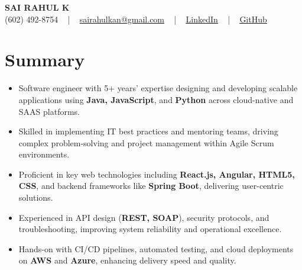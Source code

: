\documentclass[letterpaper,11pt]{article}
\newcommand{\resumeItem}[1]{
  \item\footnotesize{
    {#1 \vspace{-2pt}}
  }
}
\newcommand{\resumeItemListStart}{\begin{itemize}[leftmargin=*]}
\newcommand{\resumeItemListEnd}{\end{itemize}\vspace{-5pt}}
\begin{document}
\begin{center}
    {\fontsize{14pt}{12pt}\selectfont \textbf{\MakeUppercase{Sai Rahul K}}}\\ \vspace{2pt}
    \fontsize{10pt}{12pt}\selectfont (602) 492-8754 ~ | ~ \href{mailto:sairahulkan@gmail.com}{sairahulkan@gmail.com} ~ | ~
    \href{https://www.linkedin.com/in/rq123/}{\color{blue}\underline{LinkedIn}} ~ | ~
    \href{https://github.com/kanrahuldo}{\color{blue}\underline{GitHub}}~
    \vspace{-8pt}
\end{center}

\section{Summary}
\fontsize{9pt}{10pt}\selectfont
\resumeItemListStart
    \resumeItem{Software engineer with 5+ years' expertise designing and developing scalable applications using \textbf{Java, JavaScript}, and \textbf{Python} across cloud-native and SAAS platforms.}
    \resumeItem{Skilled in implementing IT best practices and mentoring teams, driving complex problem-solving and project management within Agile Scrum environments.}
    \resumeItem{Proficient in key web technologies including \textbf{React.js, Angular, HTML5, CSS}, and backend frameworks like \textbf{Spring Boot}, delivering user-centric solutions.}
    \resumeItem{Experienced in API design (\textbf{REST, SOAP}), security protocols, and troubleshooting, improving system reliability and operational excellence.}
    \resumeItem{Hands-on with CI/CD pipelines, automated testing, and cloud deployments on \textbf{AWS} and \textbf{Azure}, enhancing delivery speed and quality.}
\resumeItemListEnd
\vspace{-6pt}
\end{document}
